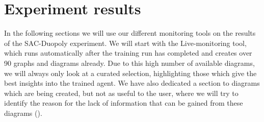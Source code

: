 
\section*{Experiment results}

In the following sections we will use our different monitoring tools on the results of the SAC-Duopoly experiment. We will start with the Live-monitoring tool, which runs automatically after the training run has completed and creates over 90 graphs and diagrams already. Due to this high number of available diagrams, we will always only look at a curated selection, highlighting those which give the best insights into the trained agent. We have also dedicated a section to diagrams which are being created, but not as useful to the user, where we will try to identify the reason for the lack of information that can be gained from these diagrams ().

